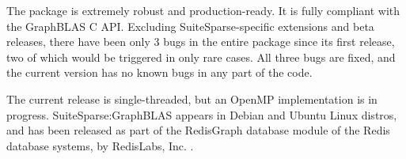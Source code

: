 The package is extremely robust and production-ready.  It is fully compliant
with the GraphBLAS C API.  Excluding SuiteSparse-specific extensions and beta
releases, there have been only 3 bugs in the entire package since its first
release, two of which would be triggered in only rare cases.  All three bugs
are fixed, and the current version has no known bugs in any part of the code.

The current release is single-threaded, but an OpenMP implementation is in
progress.  SuiteSparse:GraphBLAS appears in Debian and Ubuntu Linux distros,
and has been released as part of the RedisGraph database module of the Redis
database systems, by RedisLabs, Inc. \cite{redisgraph}.

